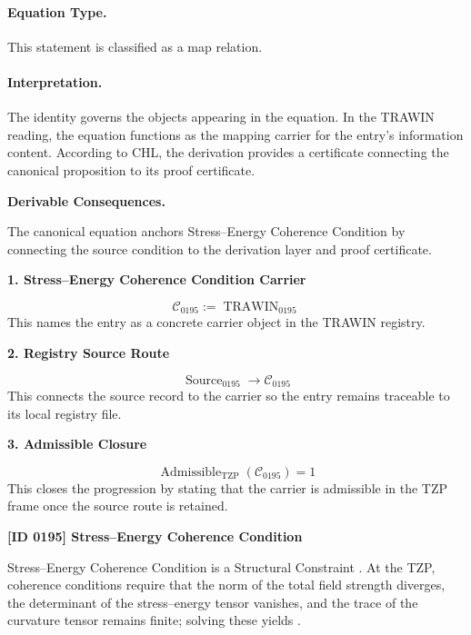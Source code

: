 \paragraph{Equation Type.}
This statement is classified as a map relation.

\paragraph{Interpretation.}
The identity governs the objects appearing in the equation. In the TRAWIN reading, the equation functions as the mapping carrier for the entry’s information content. According to CHL, the derivation provides a certificate connecting the canonical proposition to its proof certificate.

\par\vspace{0.35em}
\noindent\textbf{Derivable Consequences.}\quad
\begingroup
\footnotesize
\raggedright
The canonical equation anchors Stress--Energy Coherence Condition by connecting the source condition to the derivation layer and proof certificate.
\par\endgroup

\noindent\textbf{1. Stress--Energy Coherence Condition Carrier}\par
\[
\mathcal{C}_{0195} := \operatorname{TRAWIN}_{0195}
\]
\noindent This names the entry as a concrete carrier object in the TRAWIN registry.\par
\noindent\textbf{2. Registry Source Route}\par
\[
\operatorname{Source}_{0195}\longrightarrow \mathcal{C}_{0195}
\]
\noindent This connects the source record to the carrier so the entry remains traceable to its local registry file.\par
\noindent\textbf{3. Admissible Closure}\par
\[
\operatorname{Admissible}_{\mathrm{TZP}}\!\left(\mathcal{C}_{0195}\right)=1
\]
\noindent This closes the progression by stating that the carrier is admissible in the TZP frame once the source route is retained.\par

\clearpage
\noindent\textbf{[ID 0195] Stress--Energy Coherence Condition}\par
\vspace{0.35em}
\begingroup\small
{}
Stress--Energy Coherence Condition is a Structural Constraint  . At the TZP, coherence conditions require that the norm of the total field strength diverges, the determinant of the stress--energy tensor vanishes, and the trace of the curvature tensor remains finite; solving these yields .  

